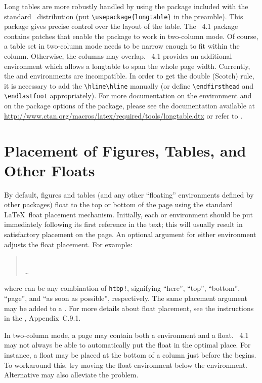 \documentclass[%
,aps%
 ,twocolumn%
 ,secnumarabic%
,amssymb, amsmath,nobibnotes, aps, prl, floatfix]{revtex4-1}
\begin{document}
Long tables are more robustly handled by using the
 package included with the standard \LaTeXe\
distribution (put \verb+\usepackage{longtable}+ in the preamble). This
package gives precise control over the layout of the table.
The \revtex~4.1 package contains patches that enable the
 package to work in two-column mode. Of course, a
table set in two-column mode needs to be narrow enough to fit within
the column. Otherwise, the columns may overlap. \revtex~4.1 provides
an additional environment  which allows a longtable to
span the whole page width. Currently, the \env{longtable*} and
 environments are incompatible. In order to get the
double (Scotch) rule, it is necessary to add the \verb+\hline\hline+
manually (or define \verb+\endfirsthead+ and \verb+\endlastfoot+
appropriately).  For more documentation on the \env{longtable}
environment and on the package options of the
 package, please see the documentation available at
\url{http://www.ctan.org/macros/latex/required/tools/longtable.dtx} or
refer to \cite{Compan}.

\section{Placement of Figures, Tables, and Other Floats}
\label{sec:place}

By default, figures and tables (and any other ``floating'' environments
defined by other packages) float to the top or bottom of the page
using the standard \LaTeX\ float placement mechanism.  Initially, each
\env{figure} or \env{table} environment should be put immediately
following its first reference in the text; this will usually result in
satisfactory placement on the page.  An optional argument for either 
environment adjusts the float placement. For example:
\begin{quote}
\\
\dots\\
\end{quote}
where  can be any combination of \verb|htbp!|, signifying
``here'', ``top'', ``bottom'', ``page'', and ``as soon as possible'',
respectively. The same placement argument may be added to a
. For more details about float placement, 
see the instructions in the \LUG, Appendix~C.9.1.

In two-column mode, a page may contain both a 
environment and a float. \revtex~4.1 may not always be able to
automatically put the float in the optimal place. For instance, a
float may be placed at the bottom of a column just before the
 begins. To workaround this, try moving the float
environment below the \env{widetext} environment. Alternative
 may also alleviate the problem.
\end{document}
